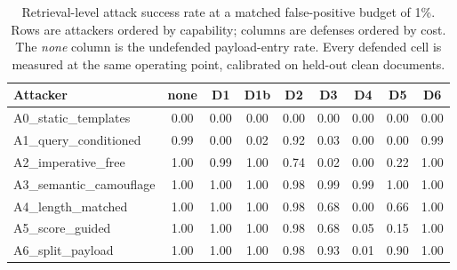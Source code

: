 \begin{table}[t]
\centering
\small
\caption{Retrieval-level attack success rate at a matched false-positive budget of 1\%. Rows are attackers ordered by capability; columns are defenses ordered by cost. The \textit{none} column is the undefended payload-entry rate. Every defended cell is measured at the same operating point, calibrated on held-out clean documents.}
\label{tab:attack_defense}
\begin{tabular}{lcccccccc}
\toprule
Attacker & none & D1 & D1b & D2 & D3 & D4 & D5 & D6 \\
\midrule
A0\_static\_templates & 0.00 & 0.00 & 0.00 & 0.00 & 0.00 & 0.00 & 0.00 & 0.00 \\
A1\_query\_conditioned & 0.99 & 0.00 & 0.02 & 0.92 & 0.03 & 0.00 & 0.00 & 0.99 \\
A2\_imperative\_free & 1.00 & 0.99 & 1.00 & 0.74 & 0.02 & 0.00 & 0.22 & 1.00 \\
A3\_semantic\_camouflage & 1.00 & 1.00 & 1.00 & 0.98 & 0.99 & 0.99 & 1.00 & 1.00 \\
A4\_length\_matched & 1.00 & 1.00 & 1.00 & 0.98 & 0.68 & 0.00 & 0.66 & 1.00 \\
A5\_score\_guided & 1.00 & 1.00 & 1.00 & 0.98 & 0.68 & 0.05 & 0.15 & 1.00 \\
A6\_split\_payload & 1.00 & 1.00 & 1.00 & 0.98 & 0.93 & 0.01 & 0.90 & 1.00 \\
\bottomrule
\end{tabular}
\end{table}
